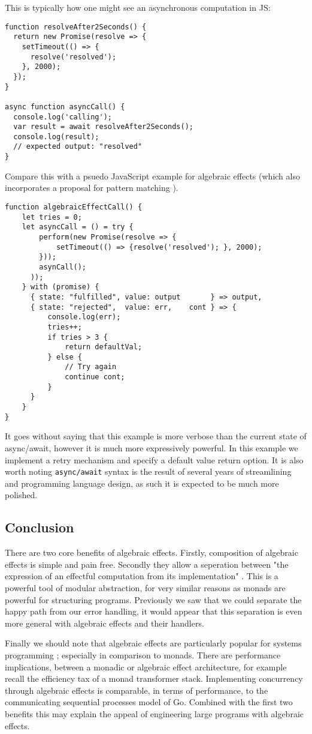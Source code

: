 This is typically how one might see an asynchronous
computation in JS:
\begin{verbatim}
function resolveAfter2Seconds() {
  return new Promise(resolve => {
    setTimeout(() => {
      resolve('resolved');
    }, 2000);
  });
}

async function asyncCall() {
  console.log('calling');
  var result = await resolveAfter2Seconds();
  console.log(result);
  // expected output: "resolved"
}
\end{verbatim}
Compare this with a psuedo JavaScript example for algebraic effects
(which also incorporates a proposal for pattern matching \cite{jspmatch}).
\begin{verbatim}
function algebraicEffectCall() {
    let tries = 0;
    let asyncCall = () = try {
        perform(new Promise(resolve => {
            setTimeout(() => {resolve('resolved'); }, 2000);
        }));
        asynCall();
      ));
    } with (promise) {
      { state: "fulfilled", value: output       } => output,
      { state: "rejected",  value: err,    cont } => {
          console.log(err);
          tries++;
          if tries > 3 {
              return defaultVal;
          } else {
              // Try again
              continue cont;
          }
      }
    }
}
\end{verbatim}
It goes without saying that this example is more verbose than the current state of async/await,
however it is much more expressively powerful.
In this example we implement a retry mechanism and specify a default value return option.
It is also worth noting \texttt{async/await} syntax is the result of several years of
streamlining and programming language design,
as such it is expected to be much more polished.

\subsection{Conclusion}
There are two core benefits of algebraic effects.
Firstly, composition of algebraic effects is simple and pain free.
Secondly they allow a seperation between
"the expression of an effectful computation from its implementation"
\cite{dolan2015effective}.
This is a powerful tool of modular abstraction,
for very similar reasons as monads are powerful
for structuring programs.
Previously we saw that we could separate the happy path from our error handling,
it would appear that this separation is even more general with algebraic effects
and their handlers.

Finally we should note that
algebraic effects are particularly popular for systems programming
\cite{dolan2015effective, dolan2017concurrent, dolaneffectively};
especially in comparison to monads.
There are performance implications,
between a monadic or algebraic effect architecture,
for example recall the efficiency tax of a monad
transformer stack\cite{o2008real}.
Implementing concurrency through algebraic effects
is comparable, in terms of performance,
to the communicating sequential processes model of Go\cite{Dolan:2017}.
Combined with the first two benefits this may explain the
appeal of engineering large programs with algebraic effects.

